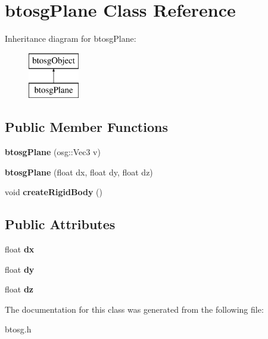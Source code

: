 \hypertarget{classbtosgPlane}{}\section{btosg\+Plane Class Reference}
\label{classbtosgPlane}
Inheritance diagram for btosg\+Plane\+:\begin{figure}[H]
\begin{center}
\leavevmode
\includegraphics[height=2.000000cm]{classbtosgPlane}
\end{center}
\end{figure}
\subsection*{Public Member Functions}
\begin{DoxyCompactItemize}
\item 
\mbox{\label{classbtosgPlane_a4bc8b74d62426eb5fa66355b71569db2}} 
{\bfseries btosg\+Plane} (osg\+::\+Vec3 v)
\item 
\mbox{\label{classbtosgPlane_a295ebe4cb55a2786764c7840d10895f4}} 
{\bfseries btosg\+Plane} (float dx, float dy, float dz)
\item 
\mbox{\label{classbtosgPlane_a0e6812c186ed1fa128dccf7cd2e525a6}} 
void {\bfseries create\+Rigid\+Body} ()
\end{DoxyCompactItemize}
\subsection*{Public Attributes}
\begin{DoxyCompactItemize}
\item 
\mbox{\label{classbtosgPlane_aca9dda4e87ee5c0d01d45fa8e120e565}} 
float {\bfseries dx}
\item 
\mbox{\label{classbtosgPlane_af3da7fce7bd8792c71c35de95cb8e7cb}} 
float {\bfseries dy}
\item 
\mbox{\label{classbtosgPlane_a87b392e258597ce4ce7c930aa58e99ec}} 
float {\bfseries dz}
\end{DoxyCompactItemize}


The documentation for this class was generated from the following file\+:\begin{DoxyCompactItemize}
\item 
btosg.\+h\end{DoxyCompactItemize}
